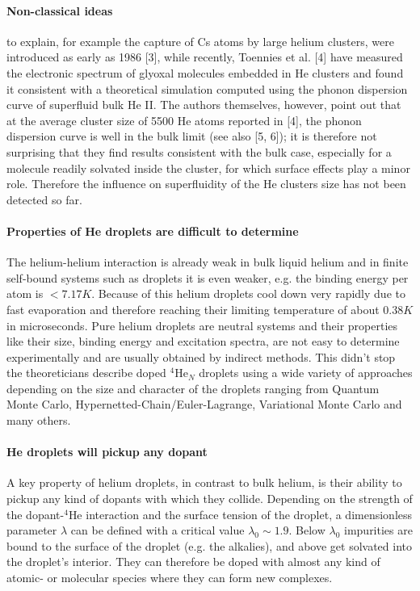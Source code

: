 		\paragraph{Non-classical ideas} to explain, for example the capture of Cs atoms by large helium clusters, were introduced as early as 1986 [3], while recently, Toennies et al. [4] have measured the electronic spectrum of glyoxal molecules embedded in He clusters and found it consistent with a theoretical simulation computed using the phonon dispersion curve of superfluid bulk He II. The authors themselves, however, point out that at the average cluster size of 5500 He atoms reported in [4], the phonon dispersion curve is well in the bulk limit (see also [5, 6]); it is therefore not surprising that they find results consistent with the bulk case, especially for a molecule readily solvated inside the cluster, for which surface effects play a minor role. Therefore the influence on superfluidity of the He clusters size has not been detected so far.
		
		\paragraph{Properties of He droplets are difficult to determine} The helium-helium interaction is already weak in bulk liquid helium and in finite self-bound systems such as droplets it is even weaker, e.g. the binding energy per atom is $<\!7.17\unit{K}$. Because of this helium droplets cool down very rapidly due to fast evaporation and therefore reaching their limiting temperature of about $0.38\unit{K}$ in microseconds. Pure helium droplets are neutral systems and their properties like their size, binding energy and excitation spectra, are not easy to determine experimentally and are usually obtained by indirect methods. This didn't stop the theoreticians describe doped $^4$He$_N$ droplets using a wide variety of approaches depending on the size and character of the droplets ranging from Quantum Monte Carlo, Hypernetted-Chain/Euler-Lagrange, Variational Monte Carlo and many others.
		
		\paragraph{He droplets will pickup any dopant} A key property of helium droplets, in contrast to bulk helium, is their ability to pickup any kind of dopants with which they collide. Depending on the strength of the dopant-$^4$He interaction and the surface tension of the droplet, a dimensionless parameter $\lambda$ can be defined\citep{Anc95} with a critical value $\lambda_0\sim1.9$. Below $\lambda_0$ impurities are bound to the surface of the droplet (e.g. the alkalies), and above get solvated into the droplet's interior. They can therefore be doped with almost any kind of atomic- or molecular species where they can form new complexes.
		
